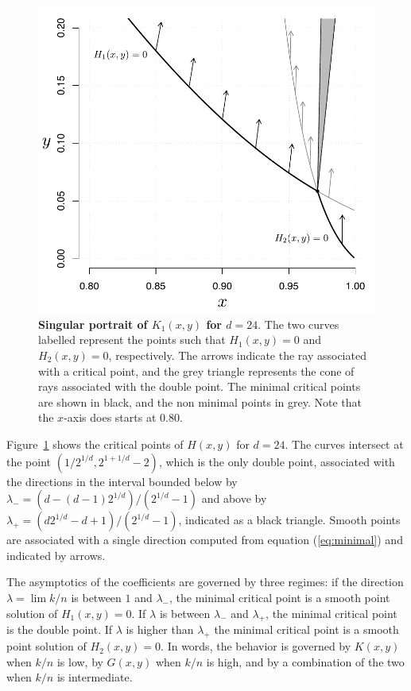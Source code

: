 \documentclass{article}
\begin{document}
\begin{figure}[h]
\centering
\includegraphics[scale=0.55]{Fig5.pdf}
\caption{\textbf{Singular portrait of $K_1(x,y)$ for $d=24$}. The two
curves labelled represent the points such that $H_1(x,y) = 0$ and
$H_2(x,y) = 0$, respectively. The arrows indicate the ray associated with
a critical point, and the grey triangle represents the cone of rays
associated with the double point. The minimal critical points are shown in
black, and the non minimal points in grey. Note that the $x$-axis does
starts at 0.80.}
\label{fig:singular}
\end{figure}

Figure~\ref{fig:singular} shows the critical points of $H(x,y)$ for
$d=24$. The curves intersect at the point $\left( 1/2^{1/d}, 2^{1+1/d}-2
\right)$, which is the only double point, associated with the directions
in the interval bounded below by $\lambda_- = (d-(d-1)2^{1/d}) /
(2^{1/d}-1)$ and above by $\lambda_+ = (d2^{1/d}-d+1) / (2^{1/d}-1)$,
indicated as a black triangle.  Smooth points are associated with a single
direction computed from equation (\ref{eq:minimal}) and indicated by
arrows.

The asymptotics of the coefficients are governed by three regimes: if the
direction $\lambda = \lim k/n$ is between $1$ and $\lambda_-$, the minimal
critical point is a smooth point solution of $H_1(x,y) = 0$. If $\lambda$
is between $\lambda_-$ and $\lambda_+$, the minimal critical point is the
double point. If $\lambda$ is higher than $\lambda_+$ the minimal critical
point is a smooth point solution of $H_2(x,y) = 0$. In words, the behavior
is governed by $K(x,y)$ when $k/n$ is low, by $G(x,y)$ when $k/n$ is high,
and by a combination of the two when $k/n$ is intermediate.
\end{document}
